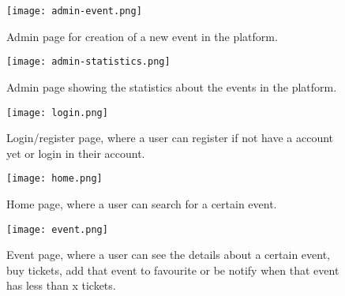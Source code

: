 \documentclass[screen,review]{acmart}
\begin{document}
\hspace{1cm}

\pagebreak
\hspace{1cm}

    \begin{figure}[h!]
        \centering
        \texttt{[image: admin-event.png]}
        \caption{Admin page for creation of a new event in the platform.}
        \label{fig:admin-event}
    \end{figure}

\hspace{1cm}

\hspace{1cm}

    \begin{figure}[h!]
        \centering
        \texttt{[image: admin-statistics.png]}
        \caption{Admin page showing the statistics about the events in the platform.}
        \label{fig:admin-statistics}
    \end{figure}

\hspace{1cm}
\pagebreak
\hspace{1cm}

    \begin{figure}[h!]
        \centering
        \texttt{[image: login.png]}
        \caption{Login/register page, where a user can register if not have a account yet or login in their account.}
        \label{fig:login}
    \end{figure}

\hspace{1cm}


\hspace{1cm}

    \begin{figure}[h!]
        \centering
        \texttt{[image: home.png]}
        \caption{Home page, where a user can search for a certain event.}
        \label{fig:home}
    \end{figure}

\hspace{1cm}
\pagebreak
\hspace{1cm}

    \begin{figure}[h!]
        \centering
        \texttt{[image: event.png]}
        \caption{Event page, where a user can see the details about a certain event, buy tickets, add that event to favourite or be notify when that event has less than x tickets.}
        \label{fig:event}
    \end{figure}
\end{document}
